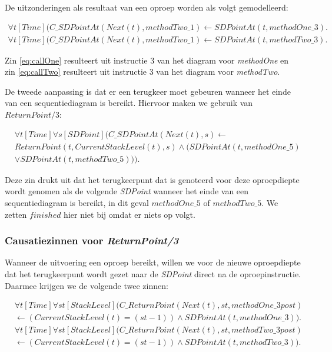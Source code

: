 De uitzonderingen als resultaat van een oproep worden als volgt gemodelleerd:

\begin{align}
	 \forall{t}[Time](C\_SDPointAt(Next(t), methodTwo\_1) \leftarrow SDPointAt(t, methodOne\_3).\label{eq:callOne} \\
	 \forall{t}[Time](C\_SDPointAt(Next(t), methodTwo\_1) \leftarrow SDPointAt(t, methodTwo\_3).\label{eq:callTwo}
\end{align}

Zin \ref{eq:callOne} resulteert uit instructie 3 van het diagram voor \textit{methodOne} en zin \ref{eq:callTwo} resulteert uit instructie 3 van het diagram voor \textit{methodTwo}.

De tweede aanpassing is dat er een terugkeer moet gebeuren wanneer het einde van een sequentiediagram is bereikt. Hiervoor maken we gebruik van $ReturnPoint/3$:

\begin{align}
	&\nonumber \forall{t}[Time]\forall{s}[SDPoint](C\_SDPointAt(Next(t), s) \leftarrow \\ \nonumber &ReturnPoint(t, CurrentStackLevel(t), s) \land (SDPointAt(t, methodOne\_5) \\ &\lor SDPointAt(t, methodTwo\_5))).\label{eq:sd-return}
\end{align}

Deze zin drukt uit dat het terugkeerpunt dat is genoteerd voor deze oproepdiepte wordt genomen als de volgende \textit{SDPoint} wanneer het einde van een sequentiediagram is bereikt, in dit geval $methodOne\_5$ of $methodTwo\_5$. We zetten $finished$ hier niet bij omdat er niets op volgt.

\subsubsection{Causatiezinnen voor \textit{ReturnPoint/3}}
Wanneer de uitvoering een oproep bereikt, willen we voor de nieuwe oproepdiepte dat het terugkeerpunt wordt gezet naar de \textit{SDPoint} direct na de oproepinstructie. Daarmee krijgen we de volgende twee zinnen:

\begin{align}
	\nonumber &\forall{t}[Time]\forall{st}[StackLevel](C\_ReturnPoint(Next(t), st, methodOne\_3post) \\ &\leftarrow (CurrentStackLevel(t) = (st-1)) \land SDPointAt(t, methodOne\_3)). \\
	\nonumber &\forall{t}[Time]\forall{st}[StackLevel](C\_ReturnPoint(Next(t), st, methodTwo\_3post) \\ &\leftarrow (CurrentStackLevel(t) = (st-1)) \land SDPointAt(t, methodTwo\_3)).
\end{align}

